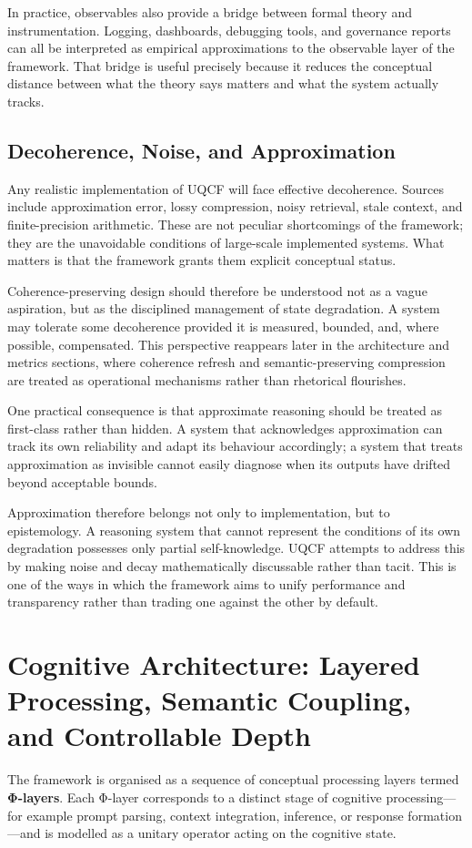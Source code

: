 \documentclass[12pt]{article}
\begin{document}
In practice, observables also provide a bridge between formal theory and instrumentation. Logging, dashboards, debugging tools, and governance reports can all be interpreted as empirical approximations to the observable layer of the framework. That bridge is useful precisely because it reduces the conceptual distance between what the theory says matters and what the system actually tracks.

\subsection{Decoherence, Noise, and Approximation}
Any realistic implementation of UQCF will face effective decoherence. Sources include approximation error, lossy compression, noisy retrieval, stale context, and finite-precision arithmetic. These are not peculiar shortcomings of the framework; they are the unavoidable conditions of large-scale implemented systems. What matters is that the framework grants them explicit conceptual status.

Coherence-preserving design should therefore be understood not as a vague aspiration, but as the disciplined management of state degradation. A system may tolerate some decoherence provided it is measured, bounded, and, where possible, compensated. This perspective reappears later in the architecture and metrics sections, where coherence refresh and semantic-preserving compression are treated as operational mechanisms rather than rhetorical flourishes.

One practical consequence is that approximate reasoning should be treated as first-class rather than hidden. A system that acknowledges approximation can track its own reliability and adapt its behaviour accordingly; a system that treats approximation as invisible cannot easily diagnose when its outputs have drifted beyond acceptable bounds.

Approximation therefore belongs not only to implementation, but to epistemology. A reasoning system that cannot represent the conditions of its own degradation possesses only partial self-knowledge. UQCF attempts to address this by making noise and decay mathematically discussable rather than tacit. This is one of the ways in which the framework aims to unify performance and transparency rather than trading one against the other by default.

\section{Cognitive Architecture: Layered Processing, Semantic Coupling, and Controllable Depth}\label{sec:cog-arch}
The framework is organised as a sequence of conceptual processing layers termed \textbf{Φ-layers}. Each Φ-layer corresponds to a distinct stage of cognitive processing---for example prompt parsing, context integration, inference, or response formation---and is modelled as a unitary operator acting on the cognitive state.
\end{document}
